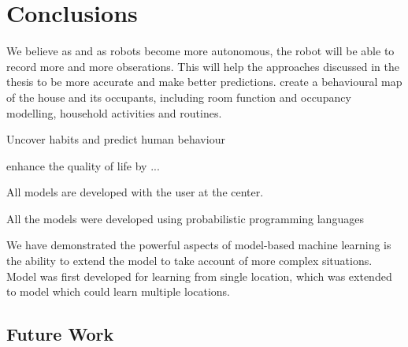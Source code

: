 \chapter{Conclusions}
\label{cha:}


We believe as and as robots become more autonomous, the robot will be able to record more and more obserations. This will help the approaches discussed in the thesis to be more accurate and make better predictions.
 create a behavioural map of the house and its occupants, including room function and occupancy modelling, household activities and routines.

Uncover habits and predict human behaviour 


enhance the quality of life by  ... 

All models are developed with the user at the center. 

All the models were developed using probabilistic programming languages 


We have demonstrated the  powerful aspects of model-based machine learning is the ability to extend the model to take account of more complex situations. 
Model was first developed for learning from single location,  which was extended to model which could learn multiple locations. 
\section{Future Work}


